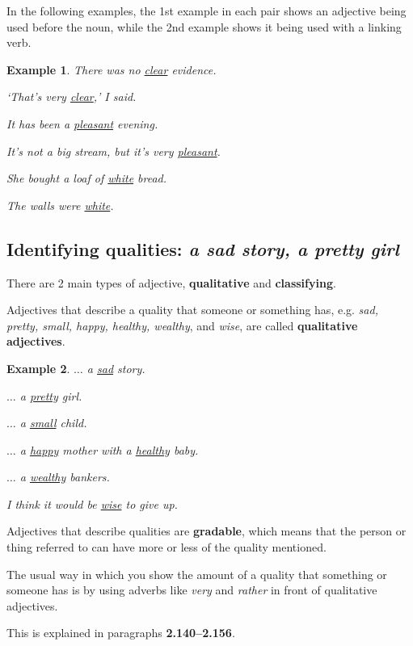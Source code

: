 \documentclass[oneside]{book}
\numberwithin{equation}{section}
\newtheorem{example}{Example}[section]
\begin{document}
%
\noindent{} In the following examples, the 1st example in each pair shows an adjective being used before the noun, while the 2nd example shows it being used with a linking verb.
\begin{example}
    There was no \underline{clear} evidence.
    
    `That's very \underline{clear},' I said.
    
    It has been a \underline{pleasant} evening.
    
    It's not a big stream, but it's very \underline{pleasant}.
    
    She bought a loaf of \underline{white} bread.
    
    The walls were \underline{white}.
\end{example}

\subsection{Identifying qualities: \textit{a sad story, a pretty girl}}
\noindent{} There are 2 main types of adjective, \textbf{qualitative} and \textbf{classifying}.

Adjectives that describe a quality that someone or something has, e.g. \textit{sad, pretty, small, happy, healthy, wealthy}, and \textit{wise}, are called \textbf{qualitative adjectives}.
\begin{example}
    $\ldots$ a \underline{sad} story.
    
    $\ldots$ a \underline{pretty} girl.
    
    $\ldots$ a \underline{small} child.
    
    $\ldots$ a \underline{happy} mother with a \underline{healthy} baby.
    
    $\ldots$ a \underline{wealthy} bankers.
    
    I think it would be \underline{wise} to give up.
\end{example}
%
\noindent{} Adjectives that describe qualities are \textbf{gradable}, which means that the person or thing referred to can have more or less of the quality mentioned.

%
\noindent{} The usual way in which you show the amount of a quality that something or someone has is by using adverbs like \textit{very} and \textit{rather} in front of qualitative adjectives.

This is explained in paragraphs \textbf{2.140--2.156}.
\end{document}
